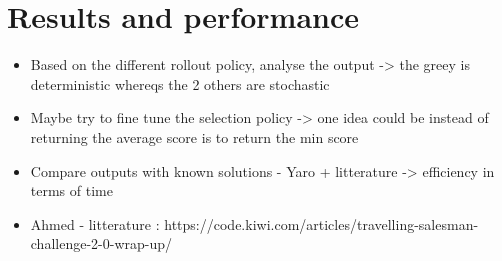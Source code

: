 \chapter{Results and performance}
\label{Chapter5}



\begin{itemize}
    \item Based on the different rollout policy, analyse the output -> the greey is deterministic whereqs the 2 others are stochastic
    \item Maybe try to fine tune the selection policy -> one idea could be instead of returning the average score is to return the min score 
    \item Compare outputs with known solutions - Yaro + litterature -> efficiency in terms of time
    \item Ahmed - litterature : https://code.kiwi.com/articles/travelling-salesman-challenge-2-0-wrap-up/
\end{itemize}